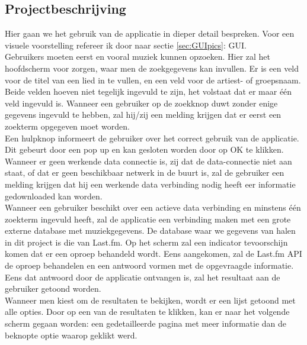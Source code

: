 \documentclass[11pt,a4paper]{article}
\begin{document}
	\subsection{Projectbeschrijving}
	\label{sec:Projectbeschrijving}
Hier gaan we het gebruik van de applicatie in dieper detail bespreken. Voor een visuele voorstelling refereer ik door naar sectie \ref{sec:GUIpics}: GUI.
\\
Gebruikers moeten eerst en vooral muziek kunnen opzoeken. Hier zal het hoofdscherm voor zorgen, waar men de zoekgegevens kan invullen. Er is een veld voor de titel van een lied in te vullen, en een veld voor de artiest- of groepsnaam. Beide velden hoeven niet tegelijk ingevuld te zijn, het volstaat dat er maar één veld ingevuld is. Wanneer een gebruiker op de zoekknop duwt zonder enige gegevens ingevuld te hebben, zal hij/zij een melding krijgen dat er eerst een zoekterm opgegeven moet worden.
\\ 

Een hulpknop informeert de gebruiker over het correct gebruik van de applicatie. Dit gebeurt door een pop up en kan gesloten worden door op OK te klikken. 
\\ 
 
Wanneer er geen werkende data connectie is, zij dat de data-connectie niet aan staat, of dat er geen beschikbaar netwerk in de buurt is, zal de gebruiker een melding krijgen dat hij een werkende data verbinding nodig heeft eer informatie gedownloaded kan worden. 
\\ 
	
Wanneer een gebruiker beschikt over een actieve data verbinding en minstens één zoekterm ingevuld heeft, zal de applicatie een verbinding maken met een grote externe database met muziekgegevens. De  database waar we gegevens van halen in dit project is die van Last.fm. Op het scherm zal een indicator tevoorschijn komen dat er een oproep behandeld wordt. Eens aangekomen, zal de Last.fm API de oproep behandelen en een antwoord vormen met de opgevraagde informatie. Eens dat antwoord door de applicatie ontvangen is, zal het resultaat aan de gebruiker getoond worden.
\\ 
	
Wanneer men kiest om de resultaten te bekijken, wordt er een lijst getoond met alle opties. Door op een van de resultaten te klikken, kan er naar het volgende scherm gegaan worden: een gedetailleerde pagina met meer informatie dan de beknopte optie waarop geklikt werd. 
\\ 
	
\end{document}
